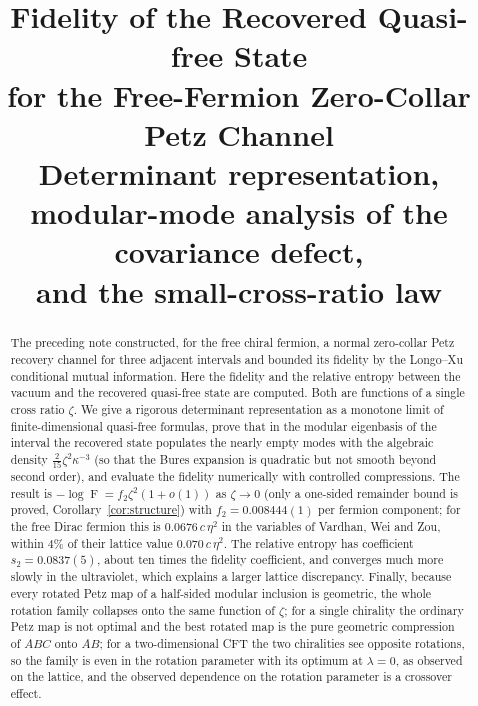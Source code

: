 \documentclass[11pt]{article}
\title{\vspace{-1.55cm}\color{navy}\bfseries
Fidelity of the Recovered Quasi-free State\\[0.25em]
\Large for the Free-Fermion Zero-Collar Petz Channel\\[0.5em]
\large Determinant representation, modular-mode analysis of the covariance defect,\\
and the small-cross-ratio law}
\author{}
\date{}
\theoremstyle{accent}
\theoremstyle{definition}
\newcommand{\Fid}{\operatorname{F}}
\begin{document}
\maketitle
\vspace{-1.55em}

\begin{abstract}
The preceding note constructed, for the free chiral fermion, a normal zero-collar Petz recovery channel for three adjacent intervals and bounded its fidelity by the Longo--Xu conditional mutual information.  Here the fidelity and the relative entropy between the vacuum and the recovered quasi-free state are computed.  Both are functions of a single cross ratio \(\zeta\).  We give a rigorous determinant representation as a monotone limit of finite-dimensional quasi-free formulas, prove that in the modular eigenbasis of the interval the recovered state populates the nearly empty modes with the algebraic density \(\frac2{15}\zeta^2\kappa^{-3}\) (so that the Bures expansion is quadratic but not smooth beyond second order), and evaluate the fidelity numerically with controlled compressions.  The result is \(-\log\Fid=f_2\zeta^2(1+o(1))\) as \(\zeta\to0\) (only a one-sided remainder bound is proved, Corollary~\ref{cor:structure}) with \(f_2=0.008444(1)\) per fermion component; for the free Dirac fermion this is \(0.0676\,c\,\eta^2\) in the variables of Vardhan, Wei and Zou, within \(4\%\) of their lattice value \(0.070\,c\,\eta^2\).  The relative entropy has coefficient \(s_2=0.0837(5)\), about ten times the fidelity coefficient, and converges much more slowly in the ultraviolet, which explains a larger lattice discrepancy.  Finally, because every rotated Petz map of a half-sided modular inclusion is geometric, the whole rotation family collapses onto the same function of \(\zeta\); for a single chirality the ordinary Petz map is not optimal and the best rotated map is the pure geometric compression of \(ABC\) onto \(AB\); for a two-dimensional CFT the two chiralities see opposite rotations, so the family is even in the rotation parameter with its optimum at \(\lambda=0\), as observed on the lattice, and the observed dependence on the rotation parameter is a crossover effect.
\end{abstract}
\end{document}

